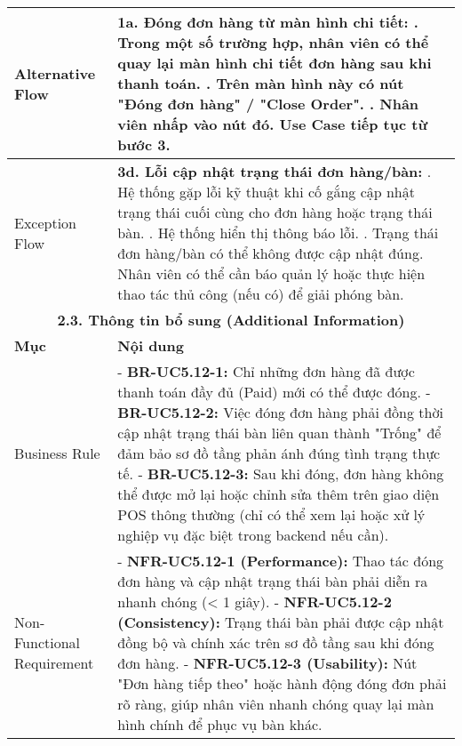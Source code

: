 \begin{longtable}{|m{4cm}|p{11cm}|}
\hline
Alternative Flow & \textbf{1a. Đóng đơn hàng từ màn hình chi tiết:} \newline    1. Trong một số trường hợp, nhân viên có thể quay lại màn hình chi tiết đơn hàng sau khi thanh toán. \newline    2. Trên màn hình này có nút "Đóng đơn hàng" / "Close Order". \newline    3. Nhân viên nhấp vào nút đó. Use Case tiếp tục từ bước 3. \\
\hline
Exception Flow & \textbf{3d. Lỗi cập nhật trạng thái đơn hàng/bàn:} \newline    1. Hệ thống gặp lỗi kỹ thuật khi cố gắng cập nhật trạng thái cuối cùng cho đơn hàng hoặc trạng thái bàn. \newline    2. Hệ thống hiển thị thông báo lỗi. \newline    3. Trạng thái đơn hàng/bàn có thể không được cập nhật đúng. Nhân viên có thể cần báo quản lý hoặc thực hiện thao tác thủ công (nếu có) để giải phóng bàn. \\
\hline
\multicolumn{2}{|c|}{\textbf{2.3. Thông tin bổ sung (Additional Information)}} \\
\hline
\textbf{Mục} & \textbf{Nội dung} \\
\hline
Business Rule & - \textbf{BR-UC5.12-1:} Chỉ những đơn hàng đã được thanh toán đầy đủ (Paid) mới có thể được đóng. \newline - \textbf{BR-UC5.12-2:} Việc đóng đơn hàng phải đồng thời cập nhật trạng thái bàn liên quan thành "Trống" để đảm bảo sơ đồ tầng phản ánh đúng tình trạng thực tế. \newline - \textbf{BR-UC5.12-3:} Sau khi đóng, đơn hàng không thể được mở lại hoặc chỉnh sửa thêm trên giao diện POS thông thường (chỉ có thể xem lại hoặc xử lý nghiệp vụ đặc biệt trong backend nếu cần). \\
\hline
Non-Functional Requirement & - \textbf{NFR-UC5.12-1 (Performance):} Thao tác đóng đơn hàng và cập nhật trạng thái bàn phải diễn ra nhanh chóng (< 1 giây). \newline - \textbf{NFR-UC5.12-2 (Consistency):} Trạng thái bàn phải được cập nhật đồng bộ và chính xác trên sơ đồ tầng sau khi đóng đơn hàng. \newline - \textbf{NFR-UC5.12-3 (Usability):} Nút "Đơn hàng tiếp theo" hoặc hành động đóng đơn phải rõ ràng, giúp nhân viên nhanh chóng quay lại màn hình chính để phục vụ bàn khác. \\
\hline
\end{longtable}

